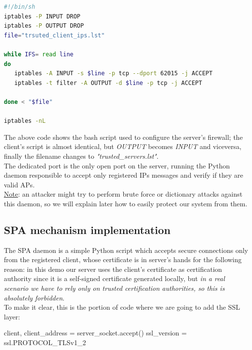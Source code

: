 \documentclass[12pt]{report}
\begin{document}
{\clearpage
\begin{center}
  \lstset{%
    caption=Server's firewall configuration script,
    basicstyle=\ttfamily\small\bfseries,
    frame=tb
  }
\begin{lstlisting}[language=bash]
#!/bin/sh
iptables -P INPUT DROP
iptables -P OUTPUT DROP
file="trsuted_client_ips.lst"

while IFS= read line
do
   iptables -A INPUT -s $line -p tcp --dport 62015 -j ACCEPT
   iptables -t filter -A OUTPUT -d $line -p tcp -j ACCEPT

done < "$file"

iptables -nL

\end{lstlisting}
\end{center}

The above code shows the bash script used to configure the server's firewall; the client's script is almost identical, but \emph{OUTPUT} becomes \emph{INPUT} and viceversa, finally the filename changes to \emph{"trusted\_servers.lst"}.\\


The dedicated port is the only open port on the server, running the Python daemon responsible to accept only registered IPs messages and verify if they are valid APs.\\
\underline{Note}:  an attacker might try to perform brute force or dictionary attacks against this daemon, so we will explain later how to easily protect our system from them.\\

\subsection{SPA mechanism implementation}
\bigskip

The SPA daemon is a simple Python script which accepts secure connections only from the registered client, whose certificate is in server's hands for the following reason: in this demo our server uses the client's certificate as certification authority since it is a self-signed certificate generated locally, but \emph{in a real scenario we have to rely only on trusted certification authorities, so this is absolutely forbidden}.\\
To make it clear, this is the portion of code where we are going to add the SSL layer:\\

\begin{python}
client, client_address = server_socket.accept()
ssl_version = ssl.PROTOCOL_TLSv1_2


\end{python}}
\end{document}
